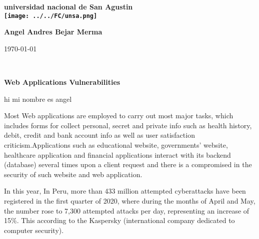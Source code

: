 \documentclass[12pt]{article}
\begin{document}
\begin{center}
\bf{\sc\Huge universidad nacional de San Agustin}\\
\vspace{20pt}
\texttt{[image: ../../FC/unsa.png]} 
\end{center}
\vspace{120pt}
\begin{center}
\bf{\sc\Huge Angel Andres Bejar Merma }\\
\end{center}
\vspace{150pt}
\begin{center}
\bf{\sc\Huge \today\par }
\end{center}
\begin{center}

\end{center}\
\newpage



\begin{center}

\bf{\sc\Huge Web Applications Vulnerabilities }\\
\end{center}
\begin{flushleft}
\vspace{25PT}
\large

hi mi nombre es angel

\end{flushleft}
\vspace{25PT}
\large

Most   Web applications are employed to
carry out most major tasks, which includes forms for collect personal, secret and private info such as health history, debit,
credit and bank account info as well as user satisfaction criticism.Applications such as educational website, governments’
website, healthcare application and financial applications interact with its backend (database) several times upon a
client request and there is a compromised in the security of such website and web application.


\vspace{15PT}



In this year, 
In Peru, more than 433 million attempted cyberattacks have been registered in the first quarter of 2020, where during the months of April and May, the number rose to 7,300 attempted attacks per day, representing an increase of 15\%.
This  according to the 
Kaspersky (international company dedicated to computer security).
\\
\end{document}
